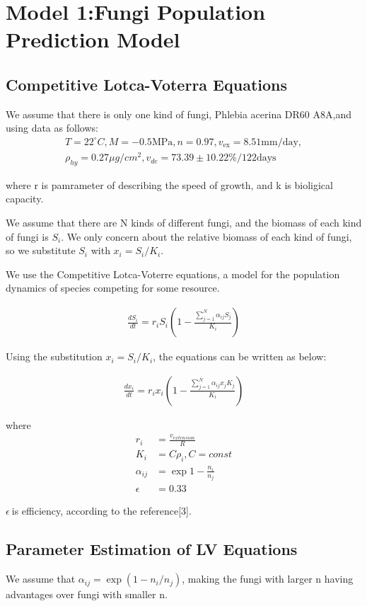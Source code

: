 \section{Model 1:Fungi Population Prediction Model}
		\subsection{Competitive Lotca-Voterra Equations}
        We assume that there is only one kind of fungi, Phlebia acerina DR60 A8A,and using data as follows:
\begin{align}%
    T=22^{\circ}C,M=-0.5\text{MPa},n=0.97,v_{\text{ex}}=8.51\text{mm/day},\nonumber\\
    \rho_{hy}=0.27\mu g/cm^2,v_{de}=73.39\pm 10.22\%/122\text{days}\nonumber
\end{align}



where r is pamrameter of describing the speed of growth, and k is bioligical capacity.

We assume that there are N kinds of different fungi, and the biomass of each kind of fungi is $S_i$. We only concern about the relative biomass of each kind of fungi, so we substitute $S_i$ with $x_i=S_i/K_i$.

We use the Competitive Lotca-Voterre equations, a model for the population dynamics of species competing for some resource. 

\begin{align}
    \frac{dS_i}{dt}=r_i S_i  (1- \frac{\sum_{j=1}^{N}\alpha_{ij}S_j}{K_i})
\end{align}

Using the substitution $x_i=S_i/K_i$, the equations can be written as below:

\begin{align}
    \frac{dx_i}{dt}=r_i x_i  (1- \frac{\sum_{j=1}^{N}\alpha_{ij}x_jK_j}{K_i})
\end{align}

where
\begin{align}
    r_i&=\frac{v_{extension}}{R}\\
    K_i&=C\rho_i,C=const\\
    \alpha_{ij}&=\exp{1-\frac{n_i}{n_j}}\\
    \epsilon&=0.33
\end{align}

$\epsilon\:$is efficiency, according to the reference[3].
		\subsection{Parameter Estimation of LV Equations}
        We assume that $\alpha_{ij}=\exp(1-n_i/n_j)$, making the fungi with larger n having advantages over fungi with smaller n.
